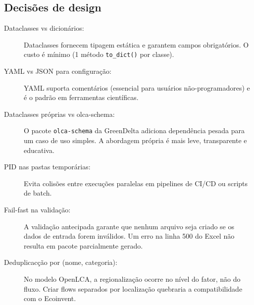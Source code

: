 \subsection{Decis\~oes de design}

\begin{description}
    \item[Dataclasses vs dicion\'arios:] Dataclasses fornecem tipagem est\'atica e garantem campos obrigat\'orios. O custo \'e m\'inimo (1 m\'etodo \texttt{to\_dict()} por classe).

    \item[YAML vs JSON para configura\c{c}\~ao:] YAML suporta coment\'arios (essencial para usu\'arios n\~ao-programadores) e \'e o padr\~ao em ferramentas cient\'ificas.

    \item[Dataclasses pr\'oprias vs olca-schema:] O pacote \texttt{olca-schema} da GreenDelta adiciona depend\^encia pesada para um caso de uso simples. A abordagem pr\'opria \'e mais leve, transparente e educativa.

    \item[PID nas pastas tempor\'arias:] Evita colis\~oes entre execu\c{c}\~oes paralelas em pipelines de CI/CD ou scripts de batch.

    \item[Fail-fast na valida\c{c}\~ao:] A valida\c{c}\~ao antecipada garante que nenhum arquivo seja criado se os dados de entrada forem inv\'alidos. Um erro na linha 500 do Excel n\~ao resulta em pacote parcialmente gerado.

    \item[Deduplicac\c{c}\~ao por (nome, categoria):] No modelo OpenLCA, a regionaliza\c{c}\~ao ocorre no n\'ivel do fator, n\~ao do fluxo. Criar flows separados por localiza\c{c}\~ao quebraria a compatibilidade com o Ecoinvent.
\end{description}
